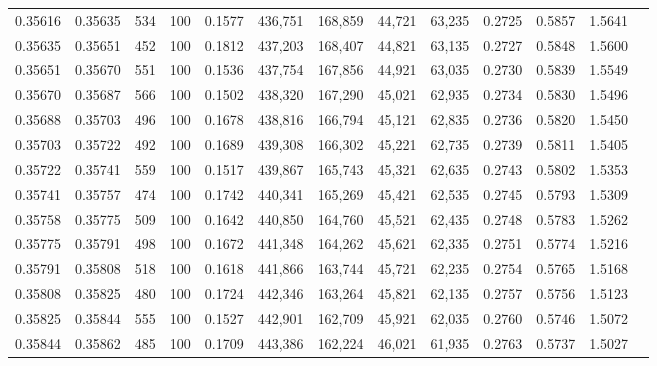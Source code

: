 \begin{tabular}{rrrrrrrrrrrrr}
0.35616 & 0.35635 &   534 & 100 &                                     0.1577 & 436,751 & 168,859 &  44,721 &  63,235 & 0.2725 & 0.5857 & 1.5641 \\
0.35635 & 0.35651 &   452 & 100 &                                     0.1812 & 437,203 & 168,407 &  44,821 &  63,135 & 0.2727 & 0.5848 & 1.5600 \\
0.35651 & 0.35670 &   551 & 100 &                                     0.1536 & 437,754 & 167,856 &  44,921 &  63,035 & 0.2730 & 0.5839 & 1.5549 \\
0.35670 & 0.35687 &   566 & 100 &                                     0.1502 & 438,320 & 167,290 &  45,021 &  62,935 & 0.2734 & 0.5830 & 1.5496 \\
0.35688 & 0.35703 &   496 & 100 &                                     0.1678 & 438,816 & 166,794 &  45,121 &  62,835 & 0.2736 & 0.5820 & 1.5450 \\
0.35703 & 0.35722 &   492 & 100 &                                     0.1689 & 439,308 & 166,302 &  45,221 &  62,735 & 0.2739 & 0.5811 & 1.5405 \\
0.35722 & 0.35741 &   559 & 100 &                                     0.1517 & 439,867 & 165,743 &  45,321 &  62,635 & 0.2743 & 0.5802 & 1.5353 \\
0.35741 & 0.35757 &   474 & 100 &                                     0.1742 & 440,341 & 165,269 &  45,421 &  62,535 & 0.2745 & 0.5793 & 1.5309 \\
0.35758 & 0.35775 &   509 & 100 &                                     0.1642 & 440,850 & 164,760 &  45,521 &  62,435 & 0.2748 & 0.5783 & 1.5262 \\
0.35775 & 0.35791 &   498 & 100 &                                     0.1672 & 441,348 & 164,262 &  45,621 &  62,335 & 0.2751 & 0.5774 & 1.5216 \\
0.35791 & 0.35808 &   518 & 100 &                                     0.1618 & 441,866 & 163,744 &  45,721 &  62,235 & 0.2754 & 0.5765 & 1.5168 \\
0.35808 & 0.35825 &   480 & 100 &                                     0.1724 & 442,346 & 163,264 &  45,821 &  62,135 & 0.2757 & 0.5756 & 1.5123 \\
0.35825 & 0.35844 &   555 & 100 &                                     0.1527 & 442,901 & 162,709 &  45,921 &  62,035 & 0.2760 & 0.5746 & 1.5072 \\
0.35844 & 0.35862 &   485 & 100 &                                     0.1709 & 443,386 & 162,224 &  46,021 &  61,935 & 0.2763 & 0.5737 & 1.5027 \\

\end{tabular}
